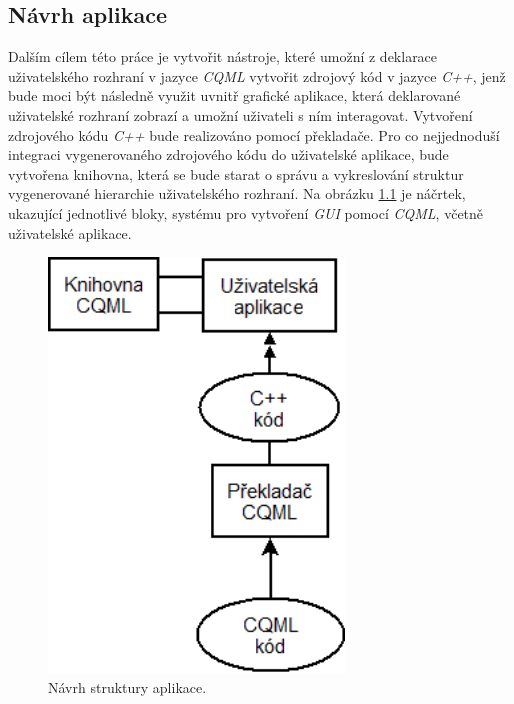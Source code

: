 \documentclass[11pt,twoside,a4paper]{book}
\begin{document}
{{\begin{ttemize}
{{\chapter{\label{CH:appDesign}Návrh aplikace}
Dalším cílem této práce je vytvořit nástroje, které umožní z deklarace uživatelského rozhraní v jazyce \textit{CQML} vytvořit zdrojový kód v jazyce \textit{C++}, jenž bude moci být následně využit uvnitř grafické aplikace, která deklarované uživatelské rozhraní zobrazí a umožní uživateli s ním interagovat. Vytvoření zdrojového kódu \textit{C++} bude realizováno pomocí překladače. Pro co nejjednoduší integraci vygenerovaného zdrojového kódu do uživatelské aplikace, bude vytvořena knihovna, která se bude starat o správu a vykreslování struktur vygenerované hierarchie uživatelského rozhraní. 
Na obrázku \ref{fig:structure1} je náčrtek, ukazující jednotlivé bloky, systému pro vytvoření \textit{GUI} pomocí \textit{CQML}, včetně uživatelské aplikace.  

\begin{figure}[!ht]
\begin{center}
  \includegraphics[width=0.7\textwidth]{Diagram1}
\caption{{\label{fig:structure1}}Návrh struktury aplikace.}
\end{center}
\end{figure}

}}
\end{ttemize}}}
\end{document}

